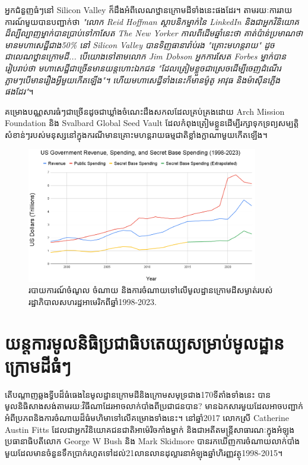 \documentclass[10pt,twocolumn,letterpaper]{article}
\begin{document}
	អ្នកជំនួញធំៗនៅ Silicon Valley ក៏ដឹងអំពីលេណឋ្ឋានក្រោមដីទាំងនេះផងដែរ។ តាមរយៈការរាយការណ៍មួយបានបញ្ជាក់ថា \textit{"លោក Reid Hoffman ស្ថាបនិកម្នាក់នៃ LinkedIn និងជាអ្នកវិនិយោគដ៏ល្បីល្បាញម្នាក់បានប្រាប់ទៅកាសែត The New Yorker កាលពីដើមឆ្នាំនេះថា គាត់ប៉ាន់ប្រមាណថាមានមហាសេដ្ឋីជាង50\% នៅ Silicon Valley បានទិញធានារ៉ាប់រង "គ្រោះមហន្តរាយ" ដូចជាលេណឋ្ឋានក្រោមដី... បើយោងទៅតាមលោក Jim Dobson អ្នកការសែត Forbes ម្នាក់បានរៀបរាប់ថា មហាសេដ្ឋីជាច្រើនមានយន្តហោះឯកជន "ដែលត្រៀមខ្លួចជាស្រេចដើម្បីចេញដំណើរភ្លាមៗបើមានរឿងអ្វីមួយកើតឡើង"។ ហើយមហាសេដ្ធីទាំងនេះក៏មានម៉ូតូ អាវុធ និងម៉ាស៊ីនភ្លើងផងដែរ"}\cite{28}។

	គម្រោងបណ្ណសារធំៗជាច្រើនដូចជាឃ្លាំងចំណេះដឹងសកលដែលគ្រប់គ្រងដោយ Arch Mission Foundation\cite{29} និង Svalbard Global Seed Vault\cite{30} ដែលកំពុងត្រៀមខ្លួនដើម្បីរក្សាទុកទ្រព្យសម្បត្តិសំខាន់ៗរបស់មនុស្សនៅក្នុងករណីមានគ្រោះមហន្តរាយធម្មជាតិខ្លាំងក្លាណាមួយកើតឡើង។
\begin{figure}[t]
\begin{center}
\includegraphics[width=0.9\textwidth]{govcrop2.png}
\end{center}
   \caption{របាយការណ៍ចំណូល ចំណាយ និងការចំណាយទៅលើមូលដ្ឋានក្រោមដីសម្ងាត់របស់រដ្ឋាភិបាលសហរដ្ឋអាមេរិកពីឆ្នាំ1998-2023\cite{19}.}
   \label{fig:9}
\end{figure}
\section{យន្តការមូលនិធិប្រជាធិបតេយ្យសម្រាប់មូលដ្ឋានក្រោមដីធំៗ}

	តើបណ្តាញឆ្លងទ្វីបដ៏ធំធេងនៃមូលដ្ឋានក្រោមដីនិងក្រោមសមុទ្រជាង170ទីតាំងទាំងនេះ បានមូលនិធិសាងសង់តាមរយ:វិធីណាដែរអាចលាក់បាំងពីប្រជាជនបាន? មានឯកសារមួយដែលអាចបញ្ជាក់អំពីប្រភពនិងការចំណាយដ៏ធំមហិមាទៅលើគម្រោងទាំងនេះ។ នៅឆ្នាំ2017 លោកស្រី​ Catherine Austin Fitts ដែលជាអ្នកវិនិយោគជនជាតិអាម៉េរិចកាំងម្នាក់ និងជាអតីតមន្ត្រីសាធារណៈក្នុងអំឡុងប្រធានាធិបតីលោក George W Bush និង Mark Skidmore បានរកឃើញការចំណាយលាក់បាំងមួយដែលមានចំនួនទឹកប្រាក់រហូតទៅដល់21លានលានដុល្លារនាអំឡុងឆ្នាំហិរញ្ញវត្ថុ1998-2015\cite{11,12,13}។
\end{document}
